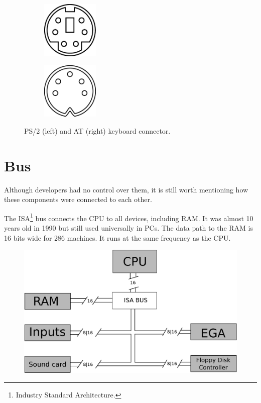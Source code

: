 \documentclass[book.tex]{subfiles}
\begin{document}
\par
\begin{figure}[H]
  \centering
  \begin{subfigure}{.5\textwidth}
    \centering
    \includegraphics[width=0.3\textwidth]{imgs/drawings/ports/MiniDIN-6_PS2.eps}
  \end{subfigure}%
  \begin{subfigure}{.5\textwidth}
    \centering
    \includegraphics[width=0.3\textwidth]{imgs/drawings/ports/AT_Diagram.eps}
  \end{subfigure}
  \caption{PS/2 (left) and AT (right) keyboard connector.}
  \label{fig:keyboard_connector}
\end{figure}

\pagebreak
\section{Bus}
Although developers had no control over them, it is still worth mentioning how these components were connected to each other.\\ 
\par

The ISA\footnote{Industry Standard Architecture.} bus connects the CPU to all devices, including RAM. It was almost 10 years old in 1990 but still used universally in PCs. The data path to the RAM is 16 bits wide for 286 machines. It runs at the same frequency as the CPU.\\
\par

\begin{figure}[H]
\centering
      \includegraphics[width=1.0\textwidth]{imgs/drawings/bus.eps}
\end{figure}
\end{document}
